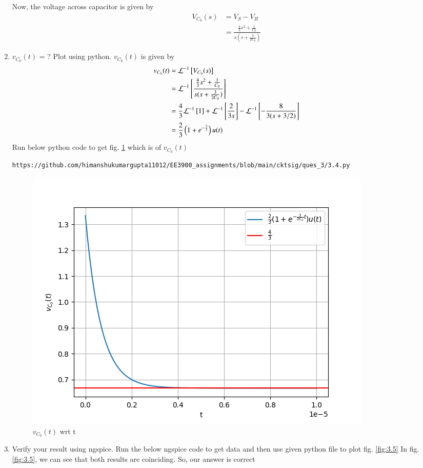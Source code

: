 \documentclass[journal,12pt,twocolumn]{IEEEtran}
\renewcommand\thesection{\arabic{section}}
\begin{document}
\begin{enumerate}[label=\arabic*.,ref=\thesection.\theenumi]
		Now, the voltage across capacitor is given by
		\begin{align}
			V_{C_0}(s)&=V_S-V_R\\
			&=\frac{\frac{4}{3}s^2+\frac{1}{C_0}}{s(s+\frac{3}{2C_0})}
		\end{align}
	\item $v_{C_0}(t)$ = ? Plot using python.
		\solution 
 $v_{C_0}(t)$ is given by
			\begin{align}
				v_{C_0}(t)&=\mathcal{L}^{-1}{}\left[V_{C_0}(s)\right]\\
				&=\mathcal{L}^{-1}{}\left[\frac{\frac{4}{3}s^2+\frac{1}{C_0}}{s(s+\frac{3}{2C_0})}\right]\\
				&=\frac{4}{3}\mathcal{L}^{-1}{}\left[1\right]+\mathcal{L}^{-1}{}\left[\frac{2}{3s}\right]-\mathcal{L}^{-1}{}\left[-\frac{8}{3(s+3/2)}\right]\\
				&=\frac{2}{3}\left(1+e^{-\frac{3}{2}}\right)u(t)
				\end{align}
				Run below python code to get fig. \ref{fig:3.4} which is of $v_{C_0}(t)$
\begin{lstlisting}
https://github.com/himanshukumargupta11012/EE3900_assignments/blob/main/cktsig/ques_3/3.4.py
		\end{lstlisting}
\begin{figure}[!ht]
	\centering
	\includegraphics[width=\columnwidth]{./ques_3/3.4.png}
	\caption{$v_{C_0}(t)$ wrt t}	
	\label{fig:3.4}
\end{figure}
	\item Verify your result using ngspice.
\solution Run the below ngspice code to get data and then use given python file to plot fig. \ref{fig:3.5}
		In fig. \ref{fig:3.5}, we can see that both results are coinciding. So, our answer is correct

\end{enumerate}
\end{document}
